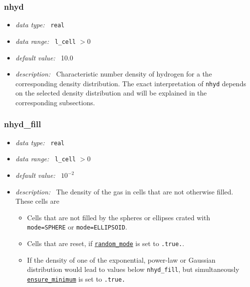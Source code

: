 \documentclass[a4paper,10pt]{article}
\begin{document}
\begin{appendix}
\subsubsection{nhyd}
\label{hydoptnl:nhyd}
\begin{itemize}
 \item \textit{data type:~} \texttt{real}
 \item \textit{data range:~} \texttt{l\_cell} $> 0$
 \item \textit{default value:~} 10.0
 \item \textit{description:~} Characteristic number density of hydrogen for a
  the corresponding density distribution. The exact interpretation of 
  \texttt{nhyd} depends on the selected density distribution and will be 
  explained in the corresponding subsections.
\end{itemize}

\subsubsection{nhyd\_fill}
\label{hydoptnl:nhydfill}
\begin{itemize}
 \item \textit{data type:~} \texttt{real}
 \item \textit{data range:~} \texttt{l\_cell} $> 0$
 \item \textit{default value:~} $10^{-2}$
 \item \textit{description:~} The density of the gas in cells that are not 
 otherwise filled. These cells are 
 \begin{itemize}
  \item Cells that are not filled by the spheres or ellipses crated with
   \texttt{mode=SPHERE} or \texttt{mode=ELLIPSOID}.
  \item Cells that are reset, if 
   \hyperref[hydopt:randommode]{\texttt{random\_mode}} is set to 
   \texttt{.true.}.
  \item If the density of one of the exponential, power-law or Gaussian 
   distribution would lead to values below \texttt{nhyd\_fill}, but 
   simultaneously 
   \hyperref[hydopt:ensureminimum]{\texttt{ensure\_minimum}} is set to 
   \texttt{.true.}
 \end{itemize}  
\end{itemize}



\end{appendix}
\end{document}
